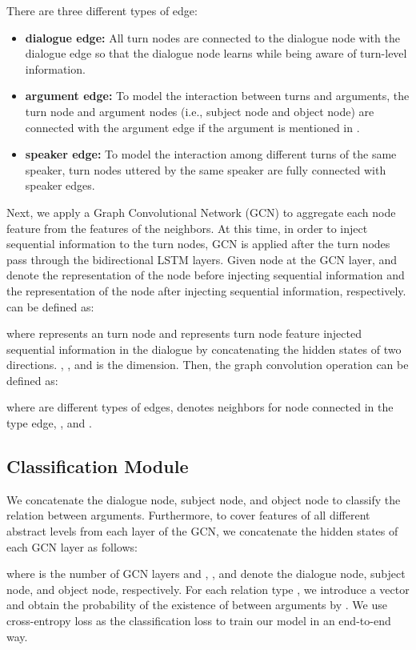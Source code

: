 \documentclass[11pt]{article}
\begin{document}
There are three different types of edge:
\begin{itemize}
\item \textbf{dialogue edge: } All turn nodes are connected to the dialogue node with the dialogue edge so that the dialogue node learns while being aware of turn-level information.
\item \textbf{argument edge: } To model the interaction between turns and arguments, the  turn node and argument nodes (i.e., subject node and object node) are connected with the argument edge if the argument is mentioned in \texttt{}.
\item \textbf{speaker edge:} To model the interaction among different turns of the same speaker, turn nodes uttered by the same speaker are fully connected with speaker edges. 
\end{itemize}

Next, we apply a Graph Convolutional Network (GCN) \citep{Kipf:2016tc} to aggregate each node feature from the features of the neighbors. At this time, in order to inject sequential information to the turn nodes, GCN is applied after the turn nodes pass through the bidirectional LSTM \citep{650093} layers.
Given node  at the  GCN layer,  and  denote the representation of the node before injecting sequential information and the representation of the node after injecting sequential information, respectively.
 can be defined as:


where  represents an  turn node and  represents turn node feature injected sequential information in the dialogue by concatenating the hidden states of two directions. , , and  is the dimension. Then, the graph convolution operation can be defined as:

where  are different types of edges,  denotes neighbors for node  connected in the  type edge, , and .


\subsection{Classification Module}
\label{ssec:Classification Module}

We concatenate the dialogue node, subject node, and object node to classify the relation between arguments.
Furthermore, to cover features of all different abstract levels from each layer of the GCN, we concatenate the hidden states of each GCN layer as follows:

where  is the number of GCN layers and , , and  denote the dialogue node, subject node, and object node, respectively.
For each relation type , we introduce a vector  and obtain the probability  of the existence of  between arguments by . We use cross-entropy loss as the classification loss to train our model in an end-to-end way.
\end{document}
